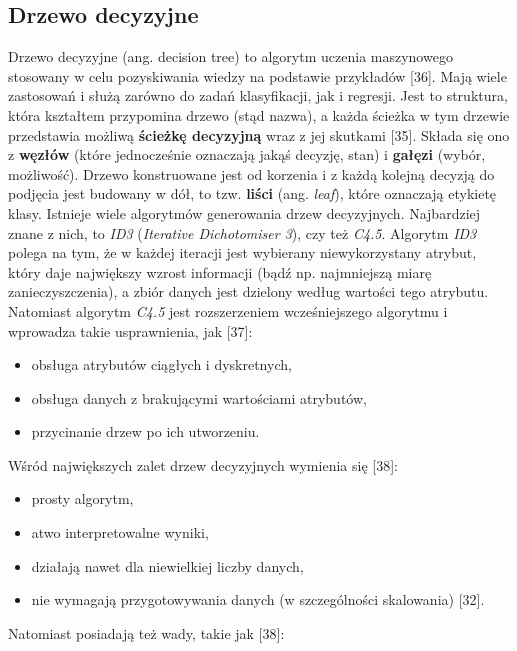 \subsection{Drzewo decyzyjne}
\label{cha:Drzewo decyzyjne}

Drzewo decyzyjne (ang. decision tree) to algorytm uczenia maszynowego stosowany w celu pozyskiwania wiedzy na podstawie przykładów [36]. Mają wiele zastosowań i służą zarówno do zadań klasyfikacji, jak i regresji. Jest to struktura, która kształtem przypomina drzewo (stąd nazwa), a każda ścieżka w tym drzewie przedstawia możliwą \textbf{ścieżkę decyzyjną} wraz z jej skutkami [35]. Składa się ono z \textbf{węzłów} (które jednocześnie oznaczają jakąś decyzję, stan) i \textbf{gałęzi} (wybór, możliwość). Drzewo konstruowane jest od korzenia i z każdą kolejną decyzją do podjęcia jest budowany w dół, to tzw. \textbf{liści} (ang. \textit{leaf}), które oznaczają etykietę klasy. Istnieje wiele algorytmów generowania drzew decyzyjnych. Najbardziej znane z nich, to \textit{ID3} (\textit{Iterative Dichotomiser 3}), czy też \textit{C4.5}. Algorytm \textit{ID3} polega na tym, że w każdej iteracji jest wybierany niewykorzystany atrybut, który daje największy wzrost informacji (bądź np. najmniejszą miarę zanieczyszczenia), a zbiór danych jest dzielony według wartości tego atrybutu. Natomiast algorytm \textit{C4.5} jest rozszerzeniem wcześniejszego algorytmu i wprowadza takie usprawnienia, jak [37]:
\begin{itemize}
\item
obsługa atrybutów ciągłych i dyskretnych,

\item
obsługa danych z brakującymi wartościami atrybutów,

\item
przycinanie drzew po ich utworzeniu.
\end{itemize}
\noindent Wśród największych zalet drzew decyzyjnych wymienia się [38]:
\begin{itemize}
\item
prosty algorytm,

\item
atwo interpretowalne wyniki,

\item
działają nawet dla niewielkiej liczby danych,

\item
nie wymagają przygotowywania danych (w szczególności skalowania) [32].
\end{itemize}
\noindent Natomiast posiadają też wady, takie jak [38]:
